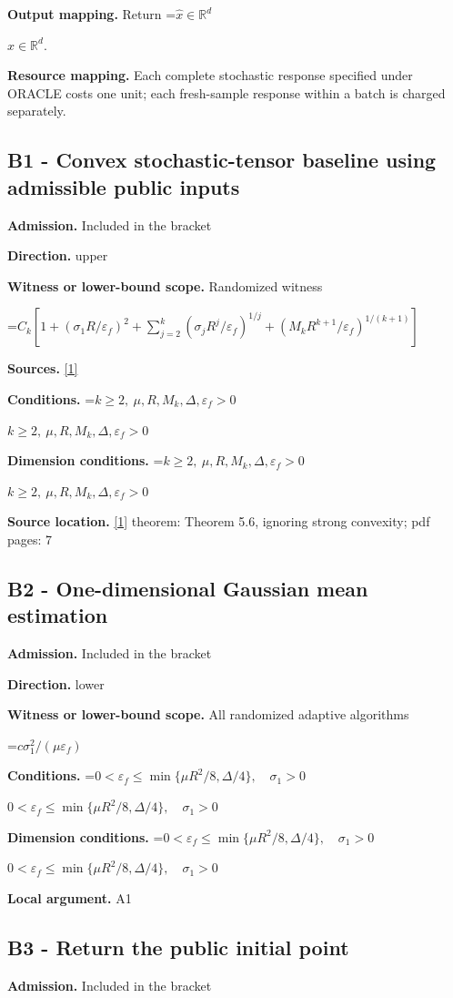 \documentclass[10pt,a4paper]{article}
\newcommand{\AtlasMath}[1]{\par\begingroup\centering\setbox0=\hbox{$\displaystyle #1$}\ifdim\wd0>1.4\linewidth\typeout{ATLAS WIDE FORMULA: \the\wd0}\fi\ifdim\wd0>\linewidth\resizebox{\linewidth}{!}{\box0}\else\box0\fi\par\endgroup}
\newcommand{\AtlasInlineMath}[1]{\begingroup\setbox0=\hbox{$#1$}\ifdim\wd0>.4\linewidth\endgroup\AtlasMath{#1}\else\endgroup$#1$\fi}
\begin{document}
\textbf{Output mapping.} Return \AtlasInlineMath{\widehat{x}\in \mathbb{R}^d}.

\textbf{Resource mapping.} Each complete stochastic response specified under ORACLE costs one unit; each fresh-sample response within a batch is charged separately.

\subsection{B1 - Convex stochastic-tensor baseline using admissible public inputs}
\textbf{Admission.} Included in the bracket

\textbf{Direction.} upper

\textbf{Witness or lower-bound scope.} Randomized witness

\AtlasMath{C_k[1+(\sigma_1R/\varepsilon_f)^2+\sum_{j=2}^k(\sigma_jR^j/\varepsilon_f)^{1/j}+(M_kR^{k+1}/\varepsilon_f)^{1/(k+1)}]}
\textbf{Sources.} \href{https://arxiv.org/pdf/2309.01570v3}{[1]}

\textbf{Conditions.} \AtlasInlineMath{k\ge2,\ \mu,R,M_k,\Delta,\varepsilon_f>0}

\textbf{Dimension conditions.} \AtlasInlineMath{k\ge2,\ \mu,R,M_k,\Delta,\varepsilon_f>0}

\textbf{Source location.} \href{https://arxiv.org/pdf/2309.01570v3}{[1]} theorem: Theorem 5.6, ignoring strong convexity; pdf pages: 7

\subsection{B2 - One-dimensional Gaussian mean estimation}
\textbf{Admission.} Included in the bracket

\textbf{Direction.} lower

\textbf{Witness or lower-bound scope.} All randomized adaptive algorithms

\AtlasMath{c\sigma_1^2/(\mu\varepsilon_f)}
\textbf{Conditions.} \AtlasInlineMath{0<\varepsilon_f\le\min\{\mu R^2/8,\Delta/4\},\quad\sigma_1>0}

\textbf{Dimension conditions.} \AtlasInlineMath{0<\varepsilon_f\le\min\{\mu R^2/8,\Delta/4\},\quad\sigma_1>0}

\textbf{Local argument.} A1

\subsection{B3 - Return the public initial point}
\textbf{Admission.} Included in the bracket
\end{document}
